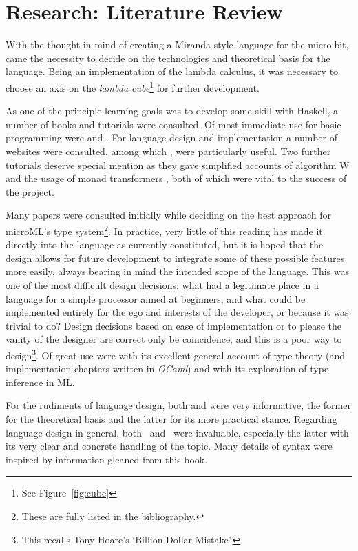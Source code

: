 \documentclass[12pt, a4paper]{report}
\begin{document}
\section{Research: Literature Review}
With the thought in mind of creating a Miranda style language for the micro:bit, came the necessity
to decide on the technologies and theoretical basis for the language. Being an implementation of the
lambda calculus, it was necessary to choose an axis on the \textit{lambda cube}\footnote{See
Figure~\ref{fig:cube}} for further development. 

As one of the principle learning goals was to develop some skill with Haskell, a number of books and
tutorials were consulted. Of most immediate use for basic programming were \cite{Lipovaca:2011:LYH:2018642}
and \cite{rwh}. For language design and implementation a number of websites were consulted, among which
\cite{scheme}, \cite{diehl} were particularly useful. Two further tutorials deserve special mention
as they gave simplified accounts of algorithm W \cite{algoW} and the usage of monad transformers
\cite{transformers}, both of which were vital to the success of the project.

Many papers were consulted initially while deciding on the best approach for microML's type
system\footnote{These are fully listed in the bibliography.}. In practice, very little of this
reading has made it directly into the language as currently constituted, but it is hoped that the
design allows for future development to integrate some of these possible features more easily,
always bearing in mind the intended scope of the language. This was one of the most difficult
design decisions: what had a legitimate place in a language for a simple processor aimed at
beginners, and what could be implemented entirely for the ego and interests of the developer, or because it
was trivial to do? Design decisions based on ease of implementation or to please the vanity of the
designer are correct only be coincidence, and this is a poor way to design\footnote{This recalls
Tony Hoare's `Billion Dollar Mistake'.}. Of great use were \cite{Pierce:2002:TPL:509043} with its
excellent general account of type theory (and implementation chapters written in \textit{OCaml})
and\@\cite{Pierce:2004:ATT:1076265} with its exploration of type inference in ML\@.

For the rudiments of language design, both\@\cite{spj2} and\@\cite{spj1} were very informative, the
former for the theoretical basis and the latter for its more practical stance. Regarding language
design in general, both~\cite{Harper:2012:PFP:2431407} and~\cite{plp} were invaluable, especially
the latter with its very clear and concrete handling of the topic. Many details of syntax were
inspired by information gleaned from this book.
\end{document}
